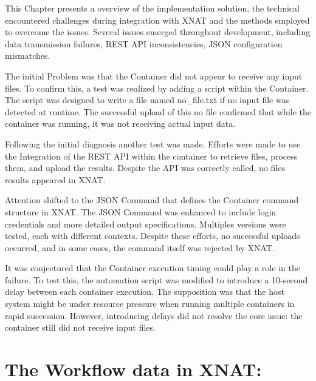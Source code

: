 

This Chapter presents a overview of the implementation solution, the technical encountered challenges during integration with XNAT and the methods employed to overcome the issues. Several issues emerged throughout development, including data transmission failures, REST API inconsistencies, JSON configuration mismatches.

The initial Problem was that the Container did not appear to receive any input files. To confirm this, a test was realized by adding a script within the Container. The script was designed to write a file named no\_file.txt if no input file was detected at runtime. The successful upload of this no file confirmed that while the container was running, it was not receiving actual input data.

Following the initial diagnosis another test was made. Efforts were made to use the Integration of the REST API within the container to retrieve files, process them, and upload the results.
Despite the API was correctly called, no files results appeared in XNAT. 

Attention shifted to the JSON Command that defines the Container command structure in XNAT. The JSON Command was enhanced to include login credentials and more detailed output specifications. Multiples versions were tested, each with different contexts. Despite these efforts, no successful uploads occurred, and in some cases, the command itself was rejected by XNAT. 

It was conjectured that the Container execution timing could play a role in the failure. To test this, the automation script was modified to introduce a 10-second delay between each container execution. The supposition was that the host system might be under resource pressure when running multiple containers in rapid succession. However, introducing delays did not resolve the core issue: the container still did not receive input files.

\section{The Workflow data in XNAT:}

